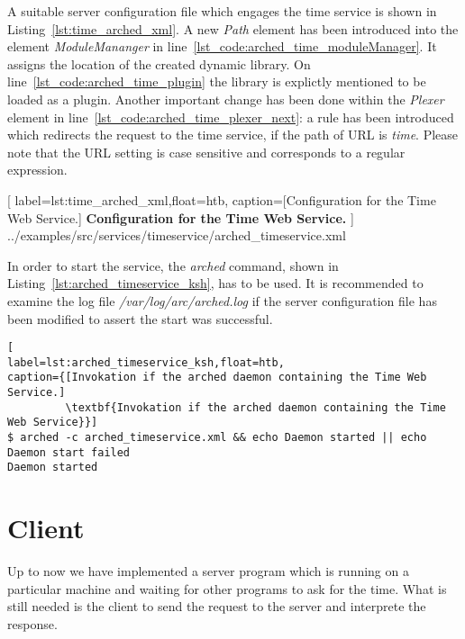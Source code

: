 A suitable server configuration file which engages the time service is shown in Listing~\ref{lst:time_arched_xml}.
A new \textit{Path} element has been introduced into the element \textit{ModuleMananger} in line~\ref{lst_code:arched_time_moduleManager}.
It assigns the location of the created dynamic library.
On line~\ref{lst_code:arched_time_plugin} the library is explictly mentioned to be loaded as a plugin.
Another important change has been done within the \textit{Plexer} element in line~\ref{lst_code:arched_time_plexer_next}:
a rule has been introduced which redirects the request to the time service, if the path of URL is \textit{time}. 
Please note that the URL setting is case sensitive and corresponds to a regular expression.\\


	[
	label=lst:time_arched_xml,float=htb,
	caption={[Configuration for the Time Web Service.]
	\textbf{Configuration for the Time Web Service.}}
	]
{../examples/src/services/timeservice/arched_timeservice.xml}

In order to start the service, the \textit{arched} command, shown in Listing~\ref{lst:arched_timeservice_ksh}, has to be used.
It is recommended to examine the log file \textit{/var/log/arc/arched.log} if the server configuration file has been modified to  assert the start was successful.

\begin{lstlisting}[
label=lst:arched_timeservice_ksh,float=htb,
caption={[Invokation if the arched daemon containing the Time Web Service.]
         \textbf{Invokation if the arched daemon containing the Time Web Service}}]
$ arched -c arched_timeservice.xml && echo Daemon started || echo Daemon start failed
Daemon started
\end{lstlisting}



\section{Client}\label{sec:timeservice_client}

Up to now we have implemented a server program which is running on a particular machine and waiting for other programs to ask for the time. What is still needed is the client to send the request to the server and interprete the response.

